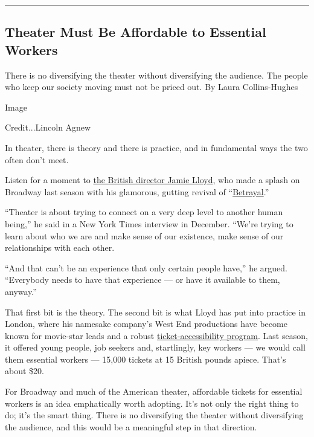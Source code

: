 \begin{center}\rule{0.5\linewidth}{\linethickness}\end{center}

\hypertarget{theater-must-be-affordable-to-essential-workers}{%
\subsection{Theater Must Be Affordable to Essential
Workers}\label{theater-must-be-affordable-to-essential-workers}}

There is no diversifying the theater without diversifying the audience.
The people who keep our society moving must not be priced out. By Laura
Collins-Hughes

Image

Credit...Lincoln Agnew

In theater, there is theory and there is practice, and in fundamental
ways the two often don't meet.

Listen for a moment to
\href{https://www.nytimes3xbfgragh.onion/2020/01/09/theater/jamie-lloyd-director-cyrano.html}{the
British director Jamie Lloyd}, who made a splash on Broadway last season
with his glamorous, gutting revival of
``\href{https://www.nytimes3xbfgragh.onion/2019/09/05/theater/betrayal-review-tom-hiddleston.html}{Betrayal}.''

``Theater is about trying to connect on a very deep level to another
human being,'' he said in a New York Times interview in December.
``We're trying to learn about who we are and make sense of our
existence, make sense of our relationships with each other.

``And that can't be an experience that only certain people have,'' he
argued. ``Everybody needs to have that experience --- or have it
available to them, anyway.''

That first bit is the theory. The second bit is what Lloyd has put into
practice in London, where his namesake company's West End productions
have become known for movie-star leads and a robust
\href{https://www.theplayhousetheatre.co.uk/the-seagull}{ticket-accessibility
program}. Last season, it offered young people, job seekers and,
startlingly, key workers --- we would call them essential workers ---
15,000 tickets at 15 British pounds apiece. That's about \$20.

For Broadway and much of the American theater, affordable tickets for
essential workers is an idea emphatically worth adopting. It's not only
the right thing to do; it's the smart thing. There is no diversifying
the theater without diversifying the audience, and this would be a
meaningful step in that direction.

